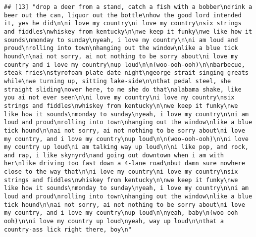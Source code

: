 \documentclass[]{article}
\begin{document}
\begin{verbatim}
## [13] "drop a deer from a stand, catch a fish with a bobber\ndrink a beer out the can, liquor out the bottle\nhow the good lord intended it, yes he did\n\ni love my country\ni love my country\nsix strings and fiddles\nwhiskey from kentucky\n\nwe keep it funky\nwe like how it sounds\nmonday to sunday\nyeah, i love my country\n\ni am loud and proud\nrolling into town\nhanging out the window\nlike a blue tick hound\n\nai not sorry, ai not nothing to be sorry about\ni love my country and i love my country\nup loud\n\n(woo-ooh-ooh)\n\nbarbecue, steak fries\nstyrofoam plate date night\ngeorge strait singing greats while\nwe turning up, sitting lake-side\n\nthat pedal steel, she straight sliding\nover here, to me she do that\nalabama shake, like you ai not ever seen\n\ni love my country\ni love my country\nsix strings and fiddles\nwhiskey from kentucky\n\nwe keep it funky\nwe like how it sounds\nmonday to sunday\nyeah, i love my country\n\ni am loud and proud\nrolling into town\nhanging out the window\nlike a blue tick hound\n\nai not sorry, ai not nothing to be sorry about\ni love my country, and i love my country\nup loud\n\n(woo-ooh-ooh)\n\ni love my country up loud\ni am talking way up loud\n\ni like pop, and rock, and rap, i like skynyrd\nand going out downtown when i am with her\nlike driving too fast down a 4-lane road\nbut damn sure nowhere close to the way that\n\ni love my country\ni love my country\nsix strings and fiddles\nwhiskey from kentucky\n\nwe keep it funky\nwe like how it sounds\nmonday to sunday\nyeah, i love my country\n\ni am loud and proud\nrolling into town\nhanging out the window\nlike a blue tick hound\n\nai not sorry, ai not nothing to be sorry about\ni love my country, and i love my country\nup loud\n\nyeah, baby\n(woo-ooh-ooh)\n\ni love my country up loud\nyeah, way up loud\n\nthat a country-ass lick right there, boy\n"                                                                                                                                                                                                                                                                                                                                                                                                                                                                                                                                                                                                                                                                                                                                                                                                                                                                                                                                                                                                                                       

\end{verbatim}
\end{document}
